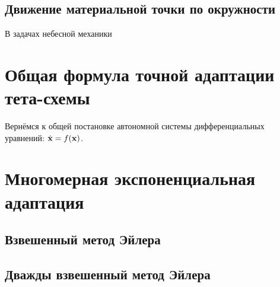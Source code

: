 % 


\subsection{Движение материальной точки по окружности}
\label{subsection:methods:circular_orbit}

В задачах небесной механики 



\section{Общая формула точной адаптации тета-схемы}
\label{section:methods:general_exact_theta_method_adaptation}

Вернёмся к общей постановке автономной системы дифференциальных уравнений: $ \dot{\mathbf{x}} = f(\mathbf{x}) $.


\section{Многомерная экспоненциальная адаптация}
\label{section:methods:exponential_fitting}

\subsection{Взвешенный метод Эйлера}
\label{subsection:methods:weighted_Euler}

\subsection{Дважды взвешенный метод Эйлера}
\label{subsection:methods:double_weighted_Euler}

